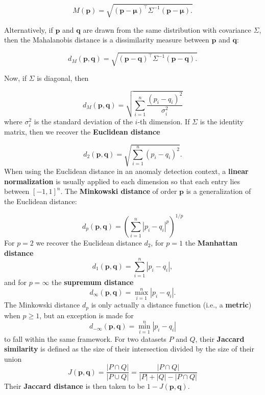 $$
M(\mathbf{p})=\sqrt{(\mathbf{p} - \mathbf{\mu})^{\!\top} \Sigma^{-1} (\mathbf{p} - \mathbf{\mu}).}
$$

\noindent Alternatively, if $\mathbf{p}$ and $\mathbf{q}$ are drawn from the same distribution with covariance $\Sigma$, then the Mahalanobis distance is a dissimilarity measure between $\mathbf{p}$ and $\mathbf{q}$: 

$$
d_M(\mathbf{p},\mathbf{q})=\sqrt{(\mathbf{p} - \mathbf{q})^{\!\top} \Sigma^{-1} (\mathbf{p} - \mathbf{q}).}
$$

\noindent Now, if  $\Sigma$ is diagonal, then 

$$
d_M(\mathbf{p},\mathbf{q})=\sqrt{\sum_{i=1}^n \frac{(p_i - q_i)^2}{\sigma_i^2}}
$$
where $\sigma_i^2$ is the standard deviation of the $i$-th dimension.
If $\Sigma$ is the identity matrix, then we recover the \textbf{Euclidean distance}

$$
d_2(\mathbf{p},\mathbf{q})=\sqrt{\sum_{i=1}^n (p_i - q_i)^2}.
$$
\noindent When using the Euclidean distance in an anomaly detection context, a \textbf{linear normalization} is usually applied to each dimension so that each entry lies between $[-1,1]^n$.
\newpage\noindent The \textbf{Minkowski distance} of order $\mathbf{p}$ is a generalization of the Euclidean distance:

$$
d_p(\mathbf{p},\mathbf{q})=\left( \sum_{i=1}^n |p_i - q_i|^p \right)^{1/p}
$$
For $p=2$ we recover the Euclidean distance $d_2$, for $p=1$ the \textbf{Manhattan distance} $$d_1(\mathbf{p},\mathbf{q})=\sum_{i=1}^n|p_i-q_i|,$$ and for $p=\infty$ the \textbf{supremum distance} $$d_{\infty}(\mathbf{p},\mathbf{q})=\max_{i=1}^n |p_i - q_i|.$$ The Minkowski distance $d_p$ is only actually a distance function (i.e., a \textbf{metric}) when  $p \geq 1$, but an exception is made for 
$$
d_{-\infty}(\mathbf{p},\mathbf{q})=\min_{i=1}^n |p_i - q_i|
$$
to fall within the same framework. \newline\newline For two datasets $P$ and $Q$, their \textbf{Jaccard similarity} is defined as the size of their intersection divided by the size of their union
$$
J(\mathbf{p}, \mathbf{q})
= \frac{|P \cap Q|}{|P \cup Q|}
= \frac{|P \cap Q|}{|P| + |Q| - |P \cap Q|}
$$
Their \textbf{Jaccard distance} is then taken to be $1 - J(\mathbf{p}, \mathbf{q})$.

